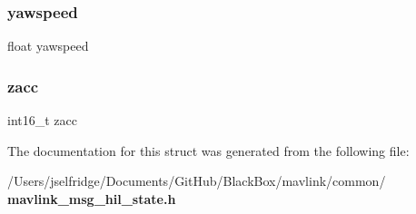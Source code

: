 \subsubsection{yawspeed}
{\footnotesize\ttfamily float yawspeed}

\mbox{\label{struct____mavlink__hil__state__t_a7dffba55b24c21b89666ccb25cd93661}} 
\subsubsection{zacc}
{\footnotesize\ttfamily int16\+\_\+t zacc}



The documentation for this struct was generated from the following file\+:\begin{DoxyCompactItemize}
\item 
/\+Users/jselfridge/\+Documents/\+Git\+Hub/\+Black\+Box/mavlink/common/\textbf{ mavlink\+\_\+msg\+\_\+hil\+\_\+state.\+h}\end{DoxyCompactItemize}
